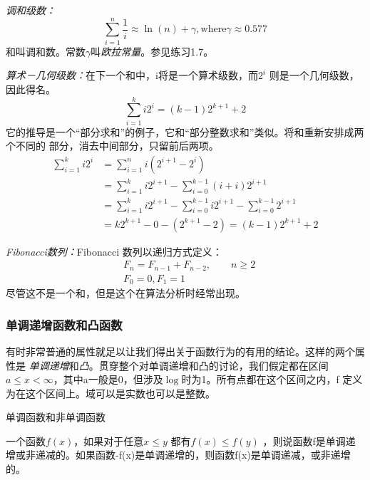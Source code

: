 \emph{调和级数：}
\begin{equation}\label{Equa:HarmonicSeries}
    \sum_{i=1}^{n}\frac{1}{i} \approx \ln(n)+\gamma, \mbox{where}
    \gamma\approx 0.577
\end{equation}
和叫调和数。常数$\gamma$叫\emph{欧拉常量}。参见练习1.7。

\emph{算术－几何级数：}在下一个和中，i将是一个算术级数，而$2^i$
则是一个几何级数，因此得名。
\begin{equation}\label{Equa:ArithmeticGeometrySeries}
    \sum_{i=1}^k i2^i=(k-1)2^{k+1} +2
\end{equation}
它的推导是一个“部分求和”的例子，它和“部分整数求和”类似。将和重新安排成两个不同的
部分，消去中间部分，只留前后两项。
\begin{displaymath}
\begin{aligned}
    \sum_{i=1}^k i2^i &= \sum_{i=1}^n i(2^{i+1} - 2^i)\\
    & =\sum_{i=1}^k i2^{i+1} - \sum_{i=0}^{k-1}(i+i)2^{i+1} \\
    & =\sum_{i=1}^k i2^{i+1} - \sum_{i=0}^{k-1} i2^{i+1}-\sum_{i=0}^{k-1} 2^{i+1}\\
    & =k2^{k+1}- 0 - (2^{k+1} - 2) = (k-1)2^{k+1}+2
\end{aligned}
\end{displaymath}

\emph{Fibonacci数列：}Fibonacci 数列以递归方式定义：
\begin{equation}\label{Equa:FibonacciSeries}
    \begin{aligned}
        &F_n=F_{n-1}+F_{n-2}, \qquad  n\geq 2\\  &F_0=0, F_1=1
    \end{aligned}
\end{equation}
尽管这不是一个和，但是这个在算法分析时经常出现。


\subsubsection{单调递增函数和凸函数}
有时非常普通的属性就足以让我们得出关于函数行为的有用的结论。这样的两个属性是
\emph{单调递增}和\emph{凸}。贯穿整个对单调递增和凸的讨论，我们假定都在区间$a\leq
x <
\infty$，其中a一般是0，但涉及$\log$时为1。所有点都在这个区间之内，f
定义为在这个区间上。域可以是实数也可以是整数。

\begin{definition}
单调函数和非单调函数

一个函数$f(x)$，如果对于任意$x\leq y$ 都有$f(x)\leq f(y)$
，则说函数f是单调递增或非递减的。如果函数-f(x)是单调递增的，则函数f(x)是单调递减，或非递增的。
\end{definition}

